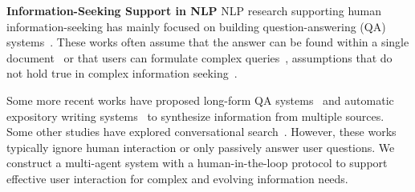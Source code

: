 \noindent
\textbf{Information-Seeking Support in NLP}\quad
NLP research supporting human information-seeking has mainly focused on building question-answering (QA) systems~\citep{chen-etal-2017-reading, lee-etal-2019-latent,dasigi-etal-2021-dataset,levy-etal-2021-open,yuan-etal-2020-interactive-machine}. These works often assume that the answer can be found within a single document~\citep{clark-etal-2020-tydi} or that users can formulate complex queries~\citep{yang-etal-2018-hotpotqa,chen2021open,ahmadvand2023making}, assumptions that do not hold true in complex information seeking~\citep{butler2000learners,booth2009craft,bystrom1995task}.


Some more recent works have proposed long-form QA systems~\citep{xu-etal-2023-critical,xu2024kiwi} and automatic expository writing systems~\citep{balepur-etal-2023-expository,shen2023summarization,shao2024assisting} to synthesize information from multiple sources. %
Some other studies have explored conversational search~\citep{kumar-callan-2020-making,nakamura-etal-2022-hybridialogue}. %
However, these works typically ignore human interaction or only passively answer user questions. We construct a multi-agent system with a human-in-the-loop protocol to support effective user interaction for complex and evolving information needs.




